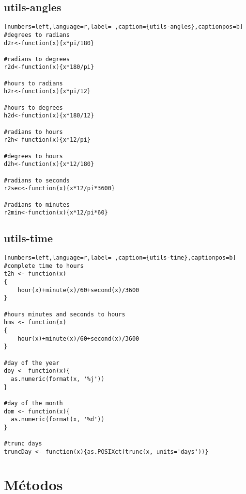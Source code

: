 \subsection{utils-angles}
\label{sec:org8ab63a9}
\label{subsec:utils-angles}
\begin{lstlisting}[numbers=left,language=r,label= ,caption={utils-angles},captionpos=b]
#degrees to radians
d2r<-function(x){x*pi/180}

#radians to degrees
r2d<-function(x){x*180/pi}

#hours to radians
h2r<-function(x){x*pi/12}

#hours to degrees
h2d<-function(x){x*180/12}

#radians to hours
r2h<-function(x){x*12/pi}

#degrees to hours
d2h<-function(x){x*12/180}

#radians to seconds
r2sec<-function(x){x*12/pi*3600}

#radians to minutes
r2min<-function(x){x*12/pi*60}
\end{lstlisting}
\subsection{utils-time}
\label{sec:orgce83b30}
\label{subsec:utils-time}
\begin{lstlisting}[numbers=left,language=r,label= ,caption={utils-time},captionpos=b]
#complete time to hours
t2h <- function(x)
{
    hour(x)+minute(x)/60+second(x)/3600
}

#hours minutes and seconds to hours
hms <- function(x)
{
    hour(x)+minute(x)/60+second(x)/3600
}

#day of the year
doy <- function(x){
  as.numeric(format(x, '%j'))
}

#day of the month
dom <- function(x){
  as.numeric(format(x, '%d'))
}

#trunc days
truncDay <- function(x){as.POSIXct(trunc(x, units='days'))}
\end{lstlisting}
\section{Métodos}
\label{sec:orga8387bc}
\label{sec:metodos}
